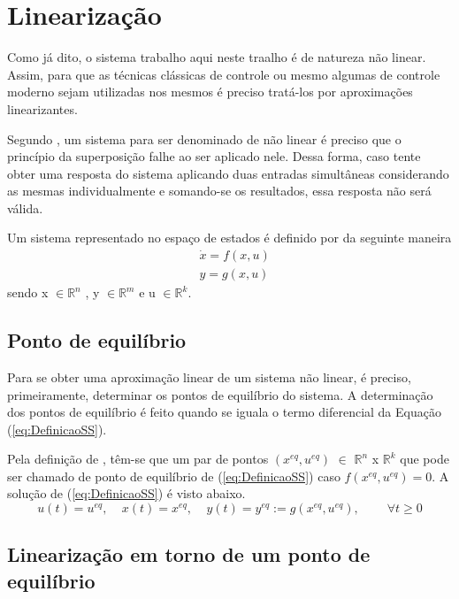 \section{Linearização}\label{sec:Linearizacao}

Como já dito, o sistema trabalho aqui neste traalho é de natureza não linear. Assim, para que as técnicas clássicas de controle ou mesmo algumas de controle moderno sejam utilizadas nos mesmos é preciso tratá-los por aproximações linearizantes.

Segundo \cite{Ogata}, um sistema para ser denominado de não linear é preciso que o princípio da superposição falhe ao ser aplicado nele. Dessa forma, caso tente obter uma resposta do sistema aplicando duas entradas simultâneas considerando as mesmas individualmente e somando-se os resultados, essa resposta não será válida.

Um sistema representado no espaço de estados é definido por \cite{Hespanha} da seguinte maneira
\begin{equation}\label{eq:DefinicaoSS}
    \begin{array}{cc}
         & \dot{x} = f(x,u) \\[6pt]
         & y = g(x,u)
    \end{array}{}
\end{equation}{}
sendo x $\in \mathbb{R}^{n}$ , y $\in \mathbb{R}^{m}$ e u $\in \mathbb{R}^{k}$.

\subsection{Ponto de equilíbrio}

Para se obter uma aproximação linear de um sistema não linear, é preciso, primeiramente, determinar os pontos de equilíbrio do sistema. A determinação dos pontos de equilíbrio é feito quando se iguala o termo diferencial da Equação (\ref{eq:DefinicaoSS}).

Pela definição de \cite{Hespanha}, têm-se que um par de pontos $(x^{eq},u^{eq})$ $\in$ $\mathbb{R}^n$ x $\mathbb{R}^k$ que pode ser chamado de ponto de equilíbrio de (\ref{eq:DefinicaoSS}) caso $f(x^{eq},u^{eq}) = 0$. A solução de (\ref{eq:DefinicaoSS}) é visto abaixo. 
\begin{equation}
    u(t) = u^{eq}, ~~~~~ x(t) = x^{eq}, ~~~~~ y(t) = y^{eq} := g(x^{eq},u^{eq}), ~~~~~~~~~~ \forall t \ge 0
\end{equation}{}

\subsection{Linearização em torno de um ponto de equilíbrio}\label{subsec:linearizacaoPontoEquilibrio}

